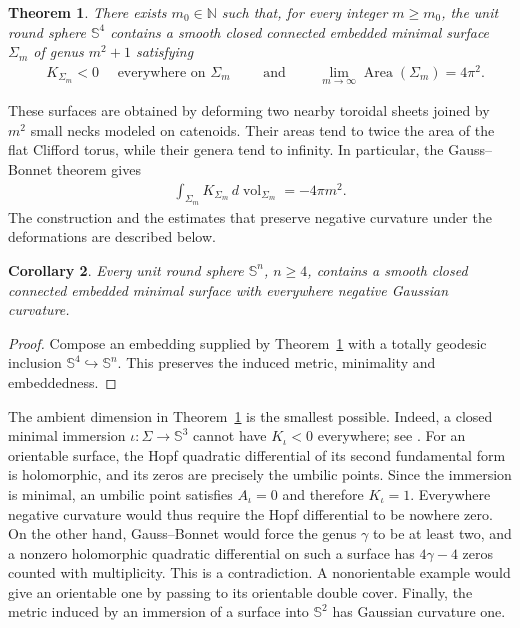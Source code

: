 \documentclass[a4paper,11pt,oneside,reqno]{amsart}
\numberwithin{equation}{section}
\newtheorem{theorem}{Theorem}[section]
\newtheorem{corollary}[theorem]{Corollary}
\theoremstyle{definition}
\begin{document}
\begin{theorem}
    \label{thm:s4-main}
    There exists $m_0\in\mathbb{N}$ such that, for every integer $m\geq m_0$, the unit round sphere $\mathbb{S}^4$ contains a smooth closed connected embedded minimal surface $\Sigma_m$ of genus $m^2+1$ satisfying
    \begin{align*}
        &K_{\Sigma_m}<0 \quad\text{ everywhere on }\Sigma_m \qquad\mbox{ and }\qquad \lim_{m\to\infty}\operatorname{Area}(\Sigma_m)=4\pi^2.
    \end{align*}
\end{theorem}
%
These surfaces are obtained by deforming two nearby toroidal sheets joined by $m^2$ small necks modeled on catenoids. Their areas tend to twice the area of the flat Clifford torus, while their genera tend to infinity. In particular, the Gauss--Bonnet theorem gives
%
\begin{align*}
    \int_{\Sigma_m}K_{\Sigma_m}\,
    d\operatorname{vol}_{\Sigma_m}=-4\pi m^2.
\end{align*}
%
The construction and the estimates that preserve negative
curvature under the deformations are described below.

\begin{corollary}
    \label{cor:s4-higher-spheres}
    Every unit round sphere $\mathbb{S}^n$, $n\geq4$, contains
    a smooth closed connected embedded minimal surface with
    everywhere negative Gaussian curvature.
\end{corollary}
\begin{proof}
    Compose an embedding supplied by Theorem~\ref{thm:s4-main}
    with a totally geodesic inclusion
    $\mathbb{S}^4\hookrightarrow\mathbb{S}^n$.
    This preserves the induced metric, minimality and
    embeddedness.
\end{proof}
%
The ambient dimension in Theorem~\ref{thm:s4-main} is the
smallest possible. Indeed, a closed minimal immersion
$\iota:\Sigma\to\mathbb{S}^3$ cannot have
$K_\iota<0$ everywhere; see
\cite[Proposition~1.5]{LawsonCompleteMinimalSurfaces}.
For an orientable surface, the Hopf quadratic differential
of its second fundamental form is holomorphic, and its
zeros are precisely the umbilic points. Since the immersion
is minimal, an umbilic point satisfies $A_\iota=0$ and
therefore $K_\iota=1$. Everywhere negative curvature would
thus require the Hopf differential to be nowhere zero.
On the other hand, Gauss--Bonnet would force the genus
$\gamma$ to be at least two, and a nonzero holomorphic
quadratic differential on such a surface has
$4\gamma-4$ zeros counted with multiplicity.
This is a contradiction. A nonorientable example would
give an orientable one by passing to its orientable double
cover. Finally, the metric induced by an immersion of a
surface into $\mathbb{S}^2$ has Gaussian curvature one.
\end{document}
